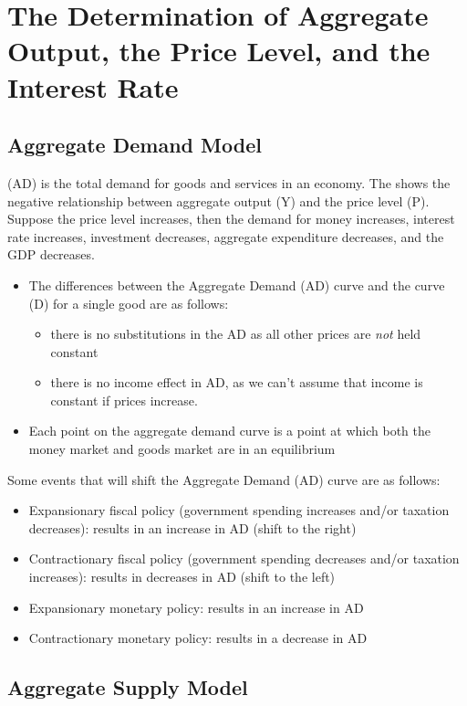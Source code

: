 \documentclass{article}
\begin{document}
\section{The Determination of Aggregate Output, the Price Level, and the Interest Rate}

\subsection{Aggregate Demand Model}

 (AD) is the total demand for goods and services in an economy. The  shows the negative relationship between aggregate output (Y) and the price level (P). Suppose the price level increases, then the demand for money increases, interest rate increases, investment decreases, aggregate expenditure decreases, and the GDP decreases. 
\begin{itemize}
  \item The differences between the Aggregate Demand (AD) curve and the curve (D) for a single good are as follows: 
    \begin{itemize}
      \item there is no substitutions in the AD as all other prices are \emph{not} held constant 
      \item there is no income effect in AD, as we can't assume that income is constant if prices increase.
    \end{itemize}
  \item Each point on the aggregate demand curve is a point at which both the money market and goods market are in an equilibrium
\end{itemize}
Some events that will shift the Aggregate Demand (AD) curve are as follows: 
\begin{itemize}
  \item Expansionary fiscal policy (government spending increases and/or taxation decreases): results in an increase in AD (shift to the right) 
  \item Contractionary fiscal policy (government spending decreases and/or taxation increases): results in decreases in AD (shift to the left)
  \item Expansionary monetary policy: results in an increase in AD 
  \item Contractionary monetary policy: results in a decrease in AD
\end{itemize}

\subsection{Aggregate Supply Model} 
\end{document}
